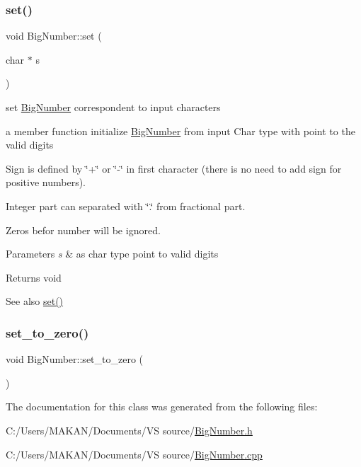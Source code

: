 \subsubsection{\texorpdfstring{set()}{set()}\hspace{0.1cm}{\footnotesize\ttfamily [3/3]}}
{\footnotesize\ttfamily void Big\+Number\+::set (\begin{DoxyParamCaption}\item[{char $\ast$}]{s }\end{DoxyParamCaption})}



set \mbox{\hyperlink{class_big_number}{Big\+Number}} correspondent to input characters 

a member function initialize \mbox{\hyperlink{class_big_number}{Big\+Number}} from input Char type with point to the valid digits


\begin{DoxyItemize}
\item Sign is defined by \char`\"{}+\char`\"{} or \char`\"{}-\/\char`\"{} in first character (there is no need to add sign for positive numbers).
\item Integer part can separated with \char`\"{}.\char`\"{} from fractional part.
\item Zeros befor number will be ignored.
\end{DoxyItemize}


\begin{DoxyParams}{Parameters}
{\em s} & as char type point to valid digits \\
\hline
\end{DoxyParams}
\begin{DoxyReturn}{Returns}
void
\end{DoxyReturn}
\begin{DoxySeeAlso}{See also}
\mbox{\hyperlink{class_big_number_af246626b1cf1be05a58e228b599fc6ee}{set()}} 
\end{DoxySeeAlso}
\mbox{\label{class_big_number_a0072f79309ab5fd673841fc92ba7cffe}} 
\subsubsection{\texorpdfstring{set\+\_\+to\+\_\+zero()}{set\_to\_zero()}}
{\footnotesize\ttfamily void Big\+Number\+::set\+\_\+to\+\_\+zero (\begin{DoxyParamCaption}{ }\end{DoxyParamCaption})}



The documentation for this class was generated from the following files\+:\begin{DoxyCompactItemize}
\item 
C\+:/\+Users/\+M\+A\+K\+A\+N/\+Documents/\+V\+S source/\mbox{\hyperlink{_big_number_8h}{Big\+Number.\+h}}\item 
C\+:/\+Users/\+M\+A\+K\+A\+N/\+Documents/\+V\+S source/\mbox{\hyperlink{_big_number_8cpp}{Big\+Number.\+cpp}}\end{DoxyCompactItemize}
